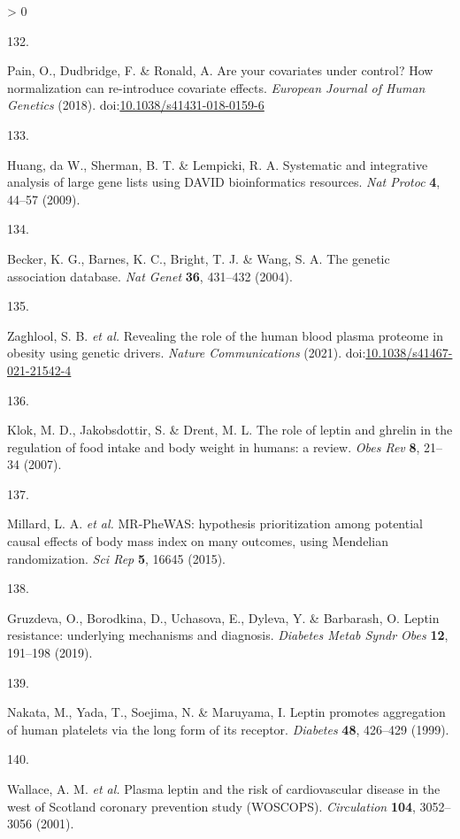 \documentclass[11pt,twoside]{bristolthesis}
\newlength{\cslhangindent}
\newlength{\csllabelwidth}
\newenvironment{CSLReferences}[2] %
 {%
  \setlength{\parindent}{0pt}
  \ifodd #1 \everypar{\setlength{\hangindent}{\cslhangindent}}\ignorespaces\fi
  \ifnum #2 > 0
  \setlength{\parskip}{#2\baselineskip}
  \fi
 }%
 {}
\newcommand{\CSLLeftMargin}[1]{\parbox[t]{\csllabelwidth}{#1}}
\newcommand{\CSLRightInline}[1]{\parbox[t]{\linewidth - \csllabelwidth}{#1}\break}
\begin{document}
\begin{CSLReferences}{0}{0}
\leavevmode\hypertarget{ref-Pain2018}{}%
\CSLLeftMargin{132. }
\CSLRightInline{Pain, O., Dudbridge, F. \& Ronald, A. {Are your covariates under control? How normalization can re-introduce covariate effects}. \emph{European Journal of Human Genetics} (2018). doi:\href{https://doi.org/10.1038/s41431-018-0159-6}{10.1038/s41431-018-0159-6}}

\leavevmode\hypertarget{ref-Huang2009}{}%
\CSLLeftMargin{133. }
\CSLRightInline{Huang, da W., Sherman, B. T. \& Lempicki, R. A. {Systematic and integrative analysis of large gene lists using DAVID bioinformatics resources}. \emph{Nat Protoc} \textbf{4}, 44--57 (2009).}

\leavevmode\hypertarget{ref-Becker2004a}{}%
\CSLLeftMargin{134. }
\CSLRightInline{Becker, K. G., Barnes, K. C., Bright, T. J. \& Wang, S. A. {The genetic association database}. \emph{Nat Genet} \textbf{36}, 431--432 (2004).}

\leavevmode\hypertarget{ref-Zaghlool2021}{}%
\CSLLeftMargin{135. }
\CSLRightInline{Zaghlool, S. B. \emph{et al.} {Revealing the role of the human blood plasma proteome in obesity using genetic drivers}. \emph{Nature Communications} (2021). doi:\href{https://doi.org/10.1038/s41467-021-21542-4}{10.1038/s41467-021-21542-4}}

\leavevmode\hypertarget{ref-Klok2007}{}%
\CSLLeftMargin{136. }
\CSLRightInline{Klok, M. D., Jakobsdottir, S. \& Drent, M. L. {The role of leptin and ghrelin in the regulation of food intake and body weight in humans: a review}. \emph{Obes Rev} \textbf{8}, 21--34 (2007).}

\leavevmode\hypertarget{ref-Millard2015}{}%
\CSLLeftMargin{137. }
\CSLRightInline{Millard, L. A. \emph{et al.} {MR-PheWAS: hypothesis prioritization among potential causal effects of body mass index on many outcomes, using Mendelian randomization}. \emph{Sci Rep} \textbf{5}, 16645 (2015).}

\leavevmode\hypertarget{ref-Gruzdeva2019a}{}%
\CSLLeftMargin{138. }
\CSLRightInline{Gruzdeva, O., Borodkina, D., Uchasova, E., Dyleva, Y. \& Barbarash, O. {Leptin resistance: underlying mechanisms and diagnosis}. \emph{Diabetes Metab Syndr Obes} \textbf{12}, 191--198 (2019).}

\leavevmode\hypertarget{ref-Nakata1999}{}%
\CSLLeftMargin{139. }
\CSLRightInline{Nakata, M., Yada, T., Soejima, N. \& Maruyama, I. {Leptin promotes aggregation of human platelets via the long form of its receptor}. \emph{Diabetes} \textbf{48}, 426--429 (1999).}

\leavevmode\hypertarget{ref-Wallace2001}{}%
\CSLLeftMargin{140. }
\CSLRightInline{Wallace, A. M. \emph{et al.} {Plasma leptin and the risk of cardiovascular disease in the west of Scotland coronary prevention study (WOSCOPS)}. \emph{Circulation} \textbf{104}, 3052--3056 (2001).}


\end{CSLReferences}
\end{document}
